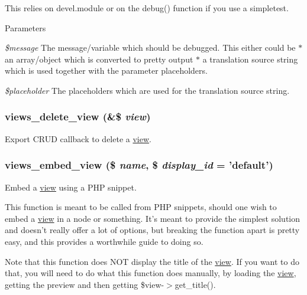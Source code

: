 This relies on devel.module or on the debug() function if you use a simpletest.


\begin{DoxyParams}{Parameters}
\item[{\em \$message}]The message/variable which should be debugged. This either could be $\ast$ an array/object which is converted to pretty output $\ast$ a translation source string which is used together with the parameter placeholders.\item[{\em \$placeholder}]The placeholders which are used for the translation source string. \end{DoxyParams}
\hypertarget{views_8module_a1eeaff33304db50bde3466466d1bfc2d}{
\subsubsection[{views\_\-delete\_\-view}]{\setlength{\rightskip}{0pt plus 5cm}views\_\-delete\_\-view (\&\$ {\em view})}}
\label{views_8module_a1eeaff33304db50bde3466466d1bfc2d}
Export CRUD callback to delete a \hyperlink{classview}{view}. \hypertarget{views_8module_ae8f9f0c72da6982461ec2423eaf88a5a}{
\subsubsection[{views\_\-embed\_\-view}]{\setlength{\rightskip}{0pt plus 5cm}views\_\-embed\_\-view (\$ {\em name}, \/  \$ {\em display\_\-id} = {\ttfamily 'default'})}}
\label{views_8module_ae8f9f0c72da6982461ec2423eaf88a5a}
Embed a \hyperlink{classview}{view} using a PHP snippet.

This function is meant to be called from PHP snippets, should one wish to embed a \hyperlink{classview}{view} in a node or something. It's meant to provide the simplest solution and doesn't really offer a lot of options, but breaking the function apart is pretty easy, and this provides a worthwhile guide to doing so.

Note that this function does NOT display the title of the \hyperlink{classview}{view}. If you want to do that, you will need to do what this function does manually, by loading the \hyperlink{classview}{view}, getting the preview and then getting \$view-\/$>$get\_\-title().



